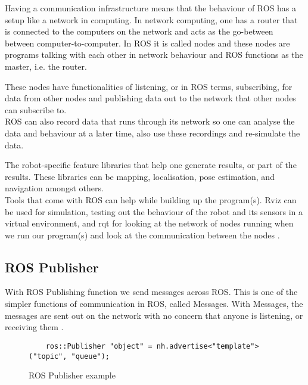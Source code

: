 Having a communication infrastructure means that the behaviour of ROS has a setup like a network in computing. In network computing, one has a router that is connected to the computers on the network and acts as the go-between between computer-to-computer. In ROS it is called nodes and these nodes are programs talking with each other in network behaviour and ROS functions as the master, i.e. the router.

These nodes have functionalities of listening, or in ROS terms, subscribing, for data from other nodes and publishing data out to the network that other nodes can subscribe to.\\

ROS can also record data that runs through its network so one can analyse the data and behaviour at a later time, also use these recordings and re-simulate the data.

The robot-specific feature libraries that help one generate results, or part of the results. These libraries can be mapping, localisation, pose estimation, and navigation amongst others.\\


Tools that come with ROS can help while building up the program(s). Rviz can be used for simulation, testing out the behaviour of the robot and its sensors in a virtual environment, and rqt for looking at the network of nodes running when we run our program(s) and look at the communication between the nodes \cite{ros_core_components}.

\newpage

\subsection{ROS Publisher}

With ROS Publishing function we send messages across ROS. This is one of the simpler functions of communication in ROS, called Messages. With Messages, the messages are sent out on the network with no concern that anyone is listening, or receiving them \cite{ROSPubSub}. %

\begin{figure}[!ht]

\begin{lstlisting}
    ros::Publisher "object" = nh.advertise<"template">("topic", "queue");
\end{lstlisting}
\vspace{-10mm}
\caption{ROS Publisher example}
\end{figure}

